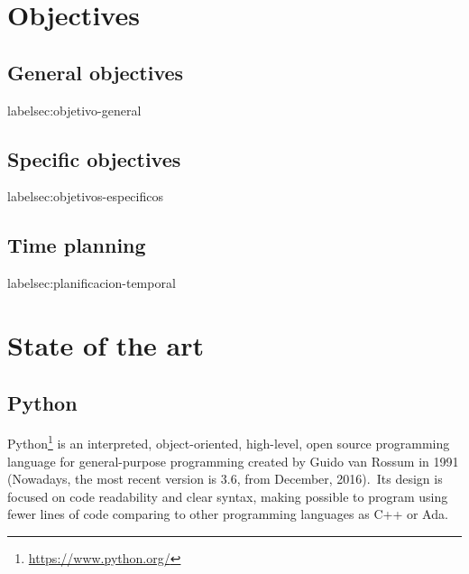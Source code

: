 \documentclass[a4paper, 12pt]{book}
\begin{document}
\chapter{Objectives}
\label{chap:objetivos}

\section{General objectives}
label{sec:objetivo-general}


\section{Specific objectives}
label{sec:objetivos-especificos}


\section{Time planning}
label{sec:planificacion-temporal}




\cleardoublepage
\chapter{State of the art}




\section{Python}
\label{sec:python}
Python\footnote{\url{https://www.python.org/}} is an interpreted, object-oriented, high-level, open source programming language for general-purpose programming created by Guido van Rossum in 1991 (Nowadays, the most recent version is 3.6, from December, 2016).\ Its design is focused on code readability and clear syntax, making possible to program using fewer lines of code comparing to other programming languages as C++ or Ada.\
\end{document}

